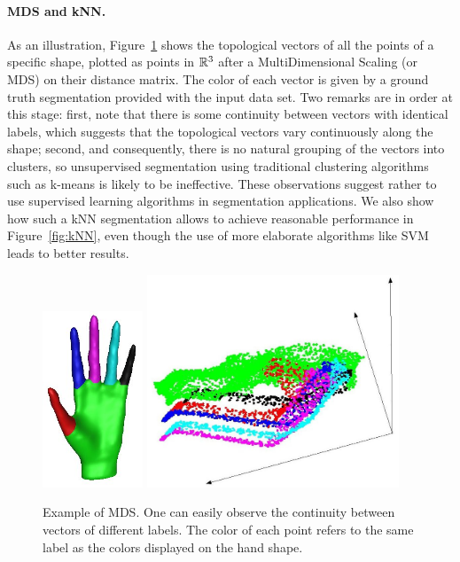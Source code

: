 \paragraph*{MDS and kNN.} As an illustration, Figure~\ref{fig:MDS} shows the
topological vectors of all the points of a specific shape, plotted as points in
$\mathbb{R}^3$ after a MultiDimensional Scaling (or MDS) on their
distance matrix. The color of each vector is given by a
ground truth segmentation provided with the input data set. Two
remarks are in order at this stage: first, note that there is some
continuity between vectors with identical labels, which suggests that the
topological vectors vary continuously along the shape; second, and consequently, there is no natural grouping of the
vectors into clusters, so unsupervised segmentation using
traditional clustering algorithms such as k-means is likely to be
ineffective. These observations suggest rather to use supervised
learning algorithms in segmentation applications.
We also show how such a kNN segmentation 
allows to achieve reasonable performance in Figure~\ref{fig:kNN}, 
even though the use of more elaborate algorithms like SVM leads to better results.


\begin{figure}[h] 
\centering 
\includegraphics[width = 3cm] {figures/hand_mds}
\includegraphics[width = 7.5cm] {figures/mdshand3}
\caption[MDS on topological vectors]{\label{fig:MDS}
Example of MDS. One can easily observe the continuity between vectors of different labels.
The color of each point refers to the same label as the colors displayed on the hand shape.} 
\end{figure}

